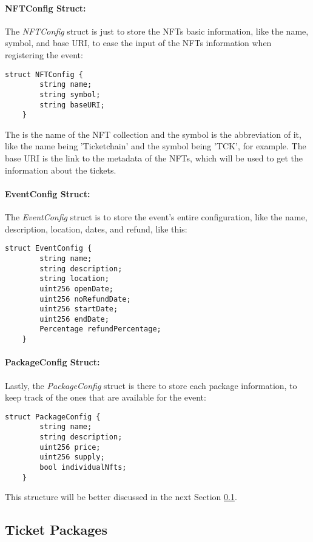 \paragraph{NFTConfig Struct:} The \textit{NFTConfig} struct is just to store the NFTs basic information, like
the name, symbol, and base URI, to ease the input of the NFTs information when
registering the event:
\begin{lstlisting}[caption=NFTConfig struct]
    struct NFTConfig {
        string name;
        string symbol;
        string baseURI;
    }
\end{lstlisting}
The is the name of the NFT collection and the symbol is the abbreviation of it,
like the name being 'Ticketchain' and the symbol being 'TCK', for example. The
base URI is the link to the metadata of the NFTs, which will be used to get the
information about the tickets.

\paragraph{EventConfig Struct:} The \textit{EventConfig} struct is to store the event's entire configuration,
like the name, description, location, dates, and refund, like this:
\begin{lstlisting}[caption=EventConfig struct]
    struct EventConfig {
        string name;
        string description;
        string location;
        uint256 openDate;
        uint256 noRefundDate;
        uint256 startDate;
        uint256 endDate;
        Percentage refundPercentage;
    }
\end{lstlisting}

\paragraph{PackageConfig Struct:} Lastly, the \textit{PackageConfig} struct is there to store each package
information, to keep track of the ones that are available for the event:
\begin{lstlisting}[caption=PackageConfig struct]
    struct PackageConfig {
        string name;
        string description;
        uint256 price;
        uint256 supply;
        bool individualNfts;
    }
\end{lstlisting}
This structure will be better discussed in the next Section
\ref{subsec:ticket_packages}.

\subsection{Ticket Packages}
\label{subsec:ticket_packages}

